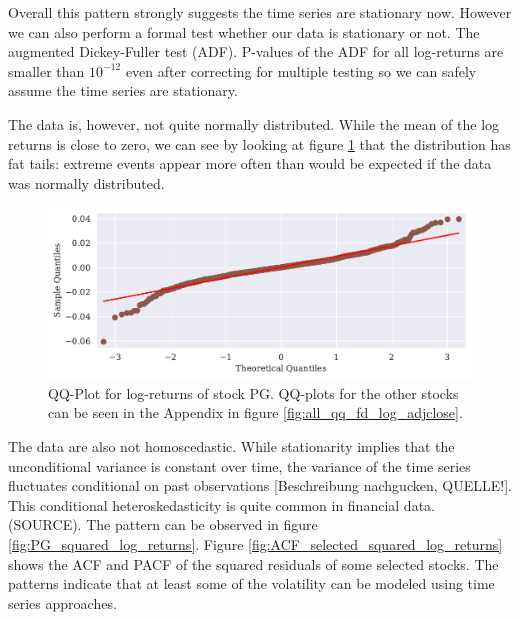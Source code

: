 \begin{table}[h!]
    \centering
    \begin{adjustbox}{width = 0.95\linewidth}
    
    \end{adjustbox}
    \caption{}
    \label{tab:log return means}
\end{table}{}

Overall this pattern strongly suggests the time series are stationary now. However we can also perform a formal test whether our data is stationary or not. The augmented Dickey-Fuller test (ADF). P-values of the ADF for all log-returns are smaller than $10^{-12}$ even after correcting for multiple testing so we can safely assume the time series are stationary. 

The data is, however, not quite normally distributed. While the mean of the log returns is close to zero, we can see by looking at figure \ref{fig:PG_qq_fd_log_adjclose} that the distribution has fat tails: extreme events appear more often than would be expected if the data was normally distributed. 

\begin{figure}[h]
    \centering
    \begin{adjustbox}{width=.9\textwidth,center}
    \includegraphics[]{figures/PG_log_adjclose_fd_and_qq.pdf}
    \end{adjustbox}  
    \caption{QQ-Plot for log-returns of stock PG. QQ-plots for the other stocks can be seen in the Appendix in figure \ref{fig:all_qq_fd_log_adjclose}.}
    \label{fig:PG_qq_fd_log_adjclose}
\end{figure}{}

The data are also not homoscedastic. While stationarity implies that the unconditional variance is constant over time, the variance of the time series fluctuates conditional on past observations [Beschreibung nachgucken, QUELLE!]. This conditional heteroskedasticity is quite common in financial data. (SOURCE). The pattern can be observed in figure \ref{fig:PG_squared_log_returns}. Figure \ref{fig:ACF_selected_squared_log_returns} shows the ACF and PACF of the squared residuals of some selected stocks. The patterns indicate that at least some of the volatility can be modeled using time series approaches. 

